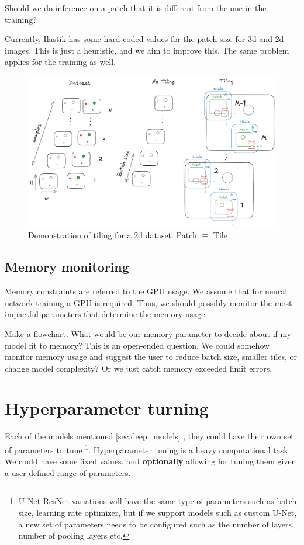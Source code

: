\documentclass[12pt, a4paper]{article}
\newcommand*{\fullref}[1]{\hyperref[{#1}]{\ref*{#1} \nameref*{#1}}}
\begin{document}
Should we do inference on a patch that it is different from the one in the training?

Currently, Ilastik has some hard-coded values for the patch size for 3d and 2d images. This is just a heuristic, and we aim to improve this. The same problem applies for the training as well.

\begin{figure}[h!]
    \centering
    \includegraphics[width=\textwidth]{tiling.png}
    \caption{Demonstration of tiling for a 2d dataset. Patch $\equiv$ Tile}
\end{figure}


\subsection{Memory monitoring}

Memory constraints are referred to the GPU usage. We assume that for neural network training a GPU is required. Thus, we should possibly monitor the most impactful parameters that determine the memory usage.

Make a flowchart. What would be our memory parameter to decide about if my model fit to memory? This is an open-ended question. We could somehow monitor memory usage and suggest the user to reduce batch size, smaller tiles, or change model complexity? Or we just catch memory exceeded limit errors.

\section{Hyperparameter turning}

Each of the models mentioned \fullref{sec:deep_models}, they could have their own set of parameters to tune \footnote{U-Net-ResNet variations will have the same type of parameters such as batch size, learning rate optimizer, but if we support models such as custom U-Net, a new set of parameters needs to be configured such as the number of layers, number of pooling layers etc.}. Hyperparameter tuning is a heavy computational task. We could have some fixed values, and \textbf{optionally} allowing for tuning them given a user defined range of parameters.
\end{document}
